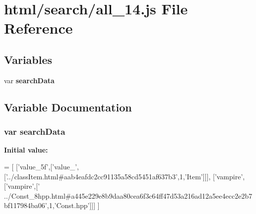 \section{html/search/all\-\_\-14.js File Reference}
\label{all__14_8js}
\subsection*{Variables}
\begin{DoxyCompactItemize}
\item 
var {\bf search\-Data}
\end{DoxyCompactItemize}


\subsection{Variable Documentation}
\subsubsection[{search\-Data}]{\setlength{\rightskip}{0pt plus 5cm}var search\-Data}\label{all__14_8js_ad01a7523f103d6242ef9b0451861231e}
{\bfseries Initial value\-:}
\begin{DoxyCode}
=
[
  [\textcolor{stringliteral}{'value\_5f'},[\textcolor{stringliteral}{'value\_'},[\textcolor{stringliteral}{'../classItem.html#aab4eafdc2cc91135a58cd5451af637b3'},1,\textcolor{stringliteral}{'Item'}]]],
  [\textcolor{stringliteral}{'vampire'},[\textcolor{stringliteral}{'vampire'},[\textcolor{stringliteral}{'
      ../Const\_8hpp.html#a445e229e8b9daa80cea6f3c64ff47d53a216ad12a5ee4ecc2e2b7bf117984ba06'},1,\textcolor{stringliteral}{'Const.hpp'}]]]
]
\end{DoxyCode}
